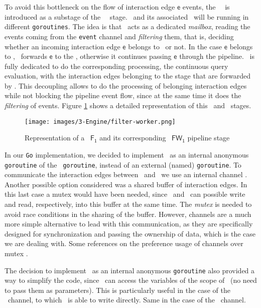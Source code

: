 \begin{itemize}
    To avoid this bottleneck on the flow of interaction edge $\mathsf{e}$ events, the \filterworker\ \FW\ is introduced as a substage of the \filter\ \F\ stage. \F\ and its associated \FW\ will be running in different \texttt{goroutines}. The idea is that \F\ acts as a dedicated \textit{mailbox}, reading the events coming from the \texttt{event} channel and \emph{filtering} them, that is, deciding whether an incoming interaction edge $\mathsf{e}$ belongs to \F\ or not. In the case $\mathsf{e}$ belongs to \F, \F\ forwards $\mathsf{e}$ to the \FW, otherwise it continues passing $\mathsf{e}$ through the pipeline. \FW\ is fully dedicated to do the corresponding processing, the continuous query evaluation, with the interaction edges belonging to the stage that are forwarded by \F. This decoupling allows to do the processing of belonging interaction edges while not blocking the pipeline event flow, since at the same time it does the \emph{filtering} of events. Figure \ref{img:filter-worker-repres} shows a detailed representation of this \F\ and \FW\ stages.\\

    \begin{figure}[H]
      \centering
      \texttt{[image: images/3-Engine/filter-worker.png]}
      \caption{Representation of a \filter\ $\mathsf{F_1}$ and its corresponding \filterworker\ $\mathsf{FW_1}$ pipeline stage}
      \label{img:filter-worker-repres}
    \end{figure}

    In our \texttt{Go} implementation, we decided to implement \FW\ as an internal anonymous \texttt{goroutine} of the \F\ \texttt{goroutine}, instead of an external (named) \texttt{goroutine}. To communicate the interaction edges between \F\ and \FW\ we use an internal channel \internaledgech. Another possible option considered was a shared buffer of interaction edges. In this last case a mutex would have been needed, since \F\ and \FW\ can possible write and read, respectively, into this buffer at the same time. The \textit{mutex} is needed to avoid race conditions in the sharing of the buffer. 
    However, channels are a much more simple alternative to lead with this communication, as they are specifically designed for synchronization and passing the ownership of data, which is the case we are dealing with. Some references on the preference usage of channels over mutex \cite{Go-channels-mutex-gowiki_mutex_channel, Go-channels-mutex-stackoverflow_mutex_channel}.

    The decision to implement \FW\ as an internal anonymous \texttt{goroutine} also provided a way to simplify the code, since \FW\ can access the variables of the scope of \F\ (no need to pass them as parameters). This is particularly useful in the case of the \alertch\ channel, to which \FW\ is able to write directly. Same in the case of the \internaledgech\ channel.


\end{itemize}
